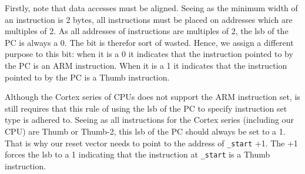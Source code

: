 Firstly, note that data accesses must be aligned. Seeing as the minimum width of an instruction is 2 bytes, all instructions must be placed on  addresses which are multiples of 2. As all addresses of instructions are multiples of 2, the lsb of the PC is always a 0. The bit is therefor sort of wasted. Hence, we assign a different purpose to this bit: when it is a 0 it indicates that the instruction pointed to by the PC is an ARM instruction. When it is a 1 it indicates that the instruction pointed to by the PC is a Thumb instruction. 

Although the Cortex series of CPUs does not support the ARM instruction set, is still requires that this rule of using the lsb of the PC to specify instruction set type is adhered to. Seeing as all instructions for the Cortex series (including our CPU) are Thumb or Thumb-2, this lsb of the PC should always be set to a 1. That is why our reset vector needs to point to the address of \texttt{\_start} +1. The +1 forces the lsb to a 1 indicating that the instruction at \texttt{\_start} is a Thumb instruction. 
